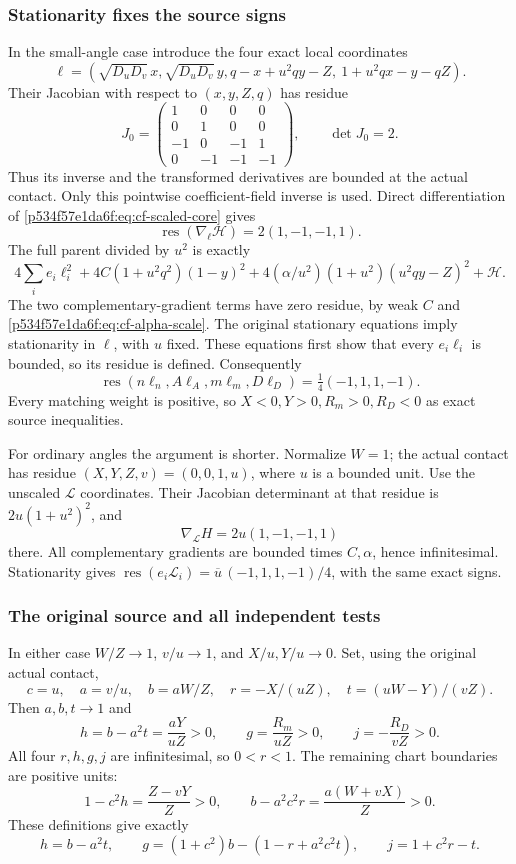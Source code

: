 \subsubsection*{Stationarity fixes the source signs}
In the small-angle case introduce the four exact local coordinates
\[
\ell=\left(\sqrt{D_uD_v}\,x,\sqrt{D_uD_v}\,y,
 q-x+u^2qy-Z,\ 1+u^2qx-y-qZ\right).
\]
Their Jacobian with respect to \((x,y,Z,q)\) has residue
\[
J_0=\begin{pmatrix}
1&0&0&0\\0&1&0&0\\-1&0&-1&1\\0&-1&-1&-1
\end{pmatrix},\qquad \det J_0=2.
\]
Thus its inverse and the transformed derivatives are bounded at the
actual contact. Only this pointwise coefficient-field inverse is used.
Direct differentiation of \eqref{p534f57e1da6f:eq:cf-scaled-core} gives
\[
\operatorname{res}(\nabla_\ell\mathcal H)=2(1,-1,-1,1).
\]
The full parent divided by \(u^2\) is exactly
\[
4\sum_i e_i\ell_i^2
 +4C(1+u^2q^2)(1-y)^2
 +4(\alpha/u^2)(1+u^2)(u^2qy-Z)^2+\mathcal H.
\]
The two complementary-gradient terms have zero residue, by weak \(C\)
and \eqref{p534f57e1da6f:eq:cf-alpha-scale}. The original stationary equations imply
stationarity in \(\ell\), with \(u\) fixed. These equations first show
that every \(e_i\ell_i\) is bounded, so its residue is defined. Consequently
\begin{equation}
\operatorname{res}(n\ell_n,A\ell_A,m\ell_m,D\ell_D)
                         =\tfrac14(-1,1,1,-1).        \label{p534f57e1da6f:eq:cf-sign-residue}
\end{equation}
Every matching weight is positive, so \(X<0,Y>0,R_m>0,R_D<0\)
as exact source inequalities.

For ordinary angles the argument is shorter. Normalize \(W=1\);
the actual contact has residue
\((X,Y,Z,v)=(0,0,1,u)\), where \(u\) is a bounded unit.
Use the unscaled \(\mathcal L\) coordinates. Their Jacobian determinant
at that residue is \(2u(1+u^2)^2\), and
\[
\nabla_{\mathcal L}H=2u(1,-1,-1,1)
\]
there. All complementary gradients are bounded times \(C,\alpha\),
hence infinitesimal. Stationarity gives
\(\operatorname{res}(e_i\mathcal L_i)
 =\overline u\,(-1,1,1,-1)/4\), with the same exact signs.

\subsubsection*{The original source and all independent tests}
In either case \(W/Z\to1\), \(v/u\to1\), and \(X/u,Y/u\to0\).
Set, using the original actual contact,
\[
c=u,\quad a=v/u,\quad b=aW/Z,\quad
r=-X/(uZ),\quad t=(uW-Y)/(vZ).
\]
Then \(a,b,t\to1\) and
\[
h=b-a^2t=\frac{aY}{uZ}>0,\qquad
g=\frac{R_m}{uZ}>0,\qquad j=-\frac{R_D}{vZ}>0.
\]
All four \(r,h,g,j\) are infinitesimal, so \(0<r<1\).
The remaining chart boundaries are positive units:
\[
1-c^2h=\frac{Z-vY}{Z}>0,\qquad
b-a^2c^2r=\frac{a(W+vX)}Z>0.
\]
These definitions give exactly
\[
h=b-a^2t,\qquad
g=(1+c^2)b-(1-r+a^2c^2t),\qquad j=1+c^2r-t.
\]

